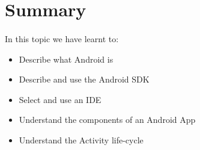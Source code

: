 \documentclass[12pt, a4paper, twoside]{book}
\begin{document}
\section{Summary}
\paragraph{} In this topic we have learnt to:

\begin{itemize}
\item Describe what Android is
\item Describe and use the Android SDK
\item Select and use an IDE
\item Understand the components of an Android App
\item Understand the Activity life-cycle
\end{itemize}

\backmatter




\end{document}

